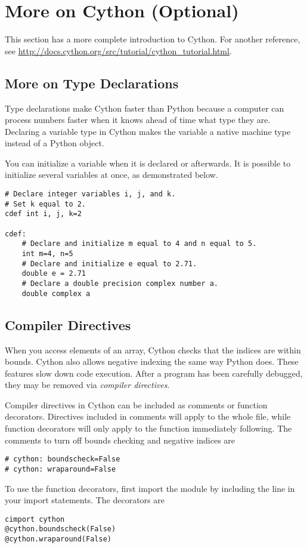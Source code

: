 \section*{More on Cython (Optional)}
This section has a more complete introduction to Cython.
For another reference, see \url{http://docs.cython.org/src/tutorial/cython_tutorial.html}.

\subsection*{More on Type Declarations}
Type declarations make Cython faster than Python because a computer can process numbers faster when it knows ahead of time what type they are.
Declaring a variable type in Cython makes the variable a native machine type instead of a Python object.

You can initialize a variable when it is declared or afterwards.
It is possible to initialize several variables at once, as demonstrated below.

\begin{lstlisting}
# Declare integer variables i, j, and k.
# Set k equal to 2.
cdef int i, j, k=2

cdef:
    # Declare and initialize m equal to 4 and n equal to 5.
    int m=4, n=5
    # Declare and initialize e equal to 2.71.
    double e = 2.71
    # Declare a double precision complex number a.
    double complex a
\end{lstlisting}

\subsection*{Compiler Directives}
When you access elements of an array, Cython checks that the indices are within bounds.
Cython also allows negative indexing the same way Python does.
These features slow down code execution.
After a program has been carefully debugged, they may be removed via \emph{compiler directives}.

Compiler directives in Cython can be included as comments or function decorators.
Directives included in comments will apply to the whole file, while function decorators will only apply to the function immediately following.
The comments to turn off bounds checking and negative indices are
\begin{lstlisting}
# cython: boundscheck=False
# cython: wraparound=False
\end{lstlisting}
To use the function decorators, first import the  module by including the line  in your import statements.
The decorators are
\begin{lstlisting}
cimport cython
@cython.boundscheck(False)
@cython.wraparound(False)
\end{lstlisting}


